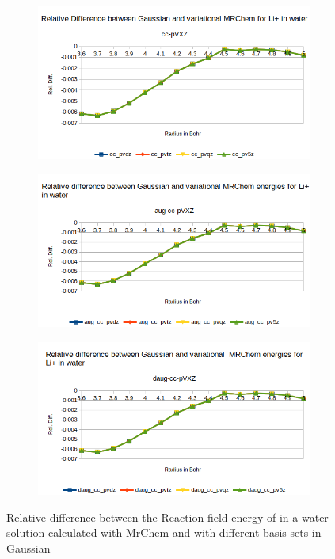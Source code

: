 \documentclass[../master_thesis.tex]{subfiles}
\begin{document}
\begin{figure}[h!]
  \centering
  \begin{subfigure}[b]{0.75\linewidth}
    \includegraphics[width=\linewidth]{img/lipvarreldiff.png}
  \end{subfigure}
  \begin{subfigure}[b]{0.75\linewidth}
    \includegraphics[width=\linewidth]{img/lipvaraugreldiff.png}
  \end{subfigure}
  \begin{subfigure}[b]{0.75\linewidth}
    \includegraphics[width=\linewidth]{img/lipvardaugreldiff.png}
  \end{subfigure}
  \caption{Relative difference between the Reaction field energy of  in a water solution calculated with MrChem
  and with different basis sets in Gaussian}
  \label{fig:lipreldiff}
\end{figure}
\end{document}
